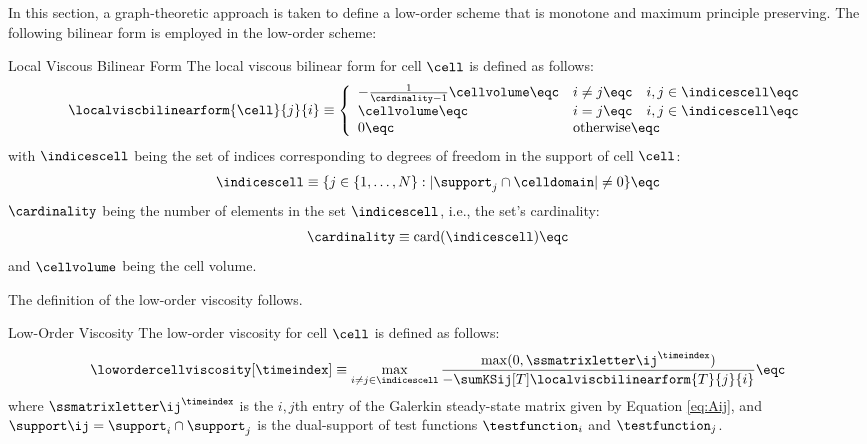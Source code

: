 In this section, a graph-theoretic approach is taken to define a low-order
scheme that is monotone and maximum principle preserving. The following
bilinear form is employed in the low-order scheme:
\begin{definition}{Local Viscous Bilinear Form}
   The local viscous bilinear form for cell $\cell$ is defined as follows:
   \begin{equation}\label{eq:bilinearform}
     \localviscbilinearform{\cell}{j}{i} \equiv \left\{\begin{array}{l l}
       -\frac{1}{\cardinality - 1}\cellvolume\eqc & i\ne j\eqc
       \quad i,j\in \indicescell\eqc \\
       \cellvolume\eqc & i = j \eqc \quad i,j\in \indicescell\eqc \\
       0          \eqc & \mbox{otherwise}\eqc
     \end{array}\right.
   \end{equation}
   with $\indicescell$ being the set of indices corresponding to degrees of
   freedom in the support of cell $\cell$:
   \begin{equation}
     \indicescell \equiv \{j\in\{1,\ldots,N\}: |\support_j\cap \celldomain|\ne 0\}
     \eqc
   \end{equation}
   $\cardinality$ being the number of elements in the set $\indicescell$,
   i.e., the set's cardinality:
   \begin{equation}
     \cardinality \equiv \textup{card}(\indicescell) \eqc
   \end{equation} 
   and $\cellvolume$ being the cell volume.
\end{definition}
The definition of the low-order viscosity follows.
\begin{definition}{Low-Order Viscosity}
   The low-order viscosity for cell $\cell$ is defined as follows:
   \begin{equation}
     \lowordercellviscosity[\timeindex] \equiv \max\limits_{i\ne j\in\indicescell}
     \frac{\max(0,\ssmatrixletter\ij^\timeindex)}
     {-\sumKSij[T]\localviscbilinearform{T}{j}{i}}
     \eqc
   \end{equation}
   where $\ssmatrixletter\ij^\timeindex$ is the $i,j$th entry of the Galerkin
   steady-state matrix given by Equation \eqref{eq:Aij}, and
   $\support\ij=\support_i\cap \support_j$ is the dual-support of test
   functions $\testfunction_i$ and $\testfunction_j$.
\end{definition}
